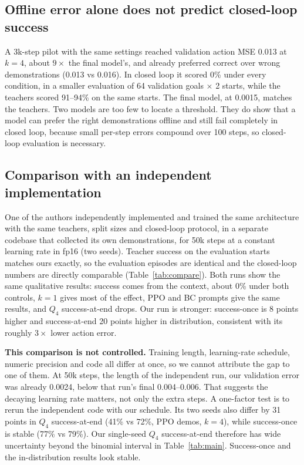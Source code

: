 \subsection{Offline error alone does not predict closed-loop success}
\label{sec:threshold}
A 3k-step pilot with the same settings reached validation action MSE 0.013 at $k = 4$, about $9\times$ the final model's, and already
preferred correct over wrong demonstrations (0.013 vs 0.016). In closed loop it scored 0\% under every condition, in a smaller
evaluation of 64 validation goals $\times$ 2 starts, while the teachers scored 91--94\% on the same starts. The final model, at
0.0015, matches the teachers. Two models are too few to locate a threshold. They do show that a model can prefer the right
demonstrations offline and still fail completely in closed loop, because small per-step errors compound over 100 steps, so
closed-loop evaluation is necessary.

\subsection{Comparison with an independent implementation}
\label{sec:compare}
One of the authors independently implemented and trained the same architecture with the same teachers, split sizes and closed-loop
protocol, in a separate codebase that collected its own demonstrations, for 50k steps at a constant learning rate in fp16 (two
seeds). Teacher success on the evaluation starts matches ours exactly, so the evaluation episodes are identical and the
closed-loop numbers are directly comparable (Table~\ref{tab:compare}). Both runs show the same qualitative results: success
comes from the context, about 0\% under both controls, $k = 1$ gives most of the effect, PPO and BC prompts give the same
results, and $Q_4$ success-at-end drops. Our run is stronger: success-once is 8 points higher and success-at-end 20 points
higher in distribution, consistent with its roughly $3\times$ lower action error.

\textbf{This comparison is not controlled.} Training length, learning-rate schedule, numeric precision and code all differ at once,
so we cannot attribute the gap to one of them. At 50k steps, the length of the independent run, our validation error was already 0.0024, below that run's
final 0.004--0.006. That suggests the decaying learning rate matters, not only the extra steps. A one-factor test is to rerun the
independent code with our schedule. Its two seeds also differ by 31 points in $Q_4$ success-at-end (41\% vs 72\%, PPO demos, $k = 4$), while
success-once is stable (77\% vs 79\%). Our single-seed $Q_4$ success-at-end therefore has wide uncertainty beyond the binomial
interval in Table~\ref{tab:main}. Success-once and the in-distribution results look stable.

